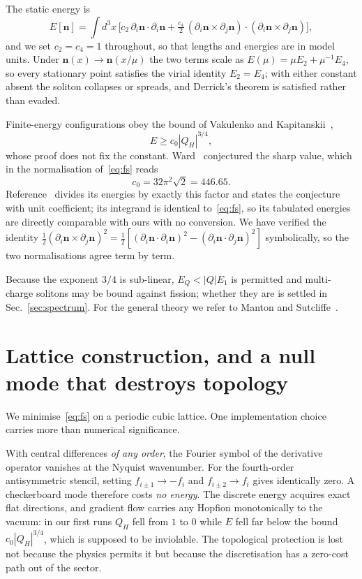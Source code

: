\documentclass[aps,prd,preprint,nofootinbib,longbibliography]{revtex4-2}
\newcommand{\nv}{\bm{n}}
\newcommand{\Qh}{Q_H}
\begin{document}
The static energy is
\begin{equation}
E[\nv]=\int d^3x\,\Big[c_2\,\partial_i\nv\cdot\partial_i\nv
 + \tfrac{c_4}{2}\,(\partial_i\nv\times\partial_j\nv)\cdot
 (\partial_i\nv\times\partial_j\nv)\Big],
\label{eq:fs}
\end{equation}
and we set $c_2=c_4=1$ throughout, so that lengths and energies are in model
units. Under $\nv(x)\to\nv(x/\mu)$ the two terms scale as
$E(\mu)=\mu E_2+\mu^{-1}E_4$, so every stationary point satisfies the virial
identity $E_2=E_4$; with either constant absent the soliton collapses or spreads,
and Derrick's theorem is satisfied rather than evaded.

Finite-energy configurations obey the bound of Vakulenko and
Kapitanskii~\cite{vakulenko1979},
\begin{equation}
E\ge c_0|\Qh|^{3/4},
\end{equation}
whose proof does not fix the constant. Ward~\cite{ward1999} conjectured the sharp
value, which in the normalisation of~\eqref{eq:fs} reads
\begin{equation}
c_0=32\pi^2\sqrt{2}=446.65 .
\label{eq:c0}
\end{equation}
Reference~\cite{sutcliffe2007} divides its energies by exactly this factor and
states the conjecture with unit coefficient; its integrand is identical
to~\eqref{eq:fs}, so its tabulated energies are directly comparable with ours
with no conversion. We have verified the identity
$\tfrac12(\partial_i\nv\times\partial_j\nv)^2
=\tfrac12[(\partial_i\nv\cdot\partial_i\nv)^2
-(\partial_i\nv\cdot\partial_j\nv)^2]$ symbolically, so the two normalisations
agree term by term.

Because the exponent $3/4$ is sub-linear, $E_Q<|Q|E_1$ is permitted and
multi-charge solitons may be bound against fission; whether they are is settled
in Sec.~\ref{sec:spectrum}. For the general theory we refer to Manton and
Sutcliffe~\cite{mantonsutcliffe2004}.

\section{Lattice construction, and a null mode that destroys topology}
\label{sec:lattice}

We minimise~\eqref{eq:fs} on a periodic cubic lattice. One implementation choice
carries more than numerical significance.

With central differences \emph{of any order}, the Fourier symbol of the
derivative operator vanishes at the Nyquist wavenumber. For the fourth-order
antisymmetric stencil, setting $f_{i\pm1}\to-f_i$ and
$f_{i\pm2}\to f_i$ gives identically zero. A checkerboard mode therefore costs
\emph{no energy}. The discrete energy acquires exact flat directions, and
gradient flow carries any Hopfion monotonically to the vacuum: in our first runs
$\Qh$ fell from $1$ to $0$ while $E$ fell far below the bound $c_0|\Qh|^{3/4}$,
which is supposed to be inviolable. The topological protection is
lost not because the physics permits it but because the discretisation has a
zero-cost path out of the sector.
\end{document}
